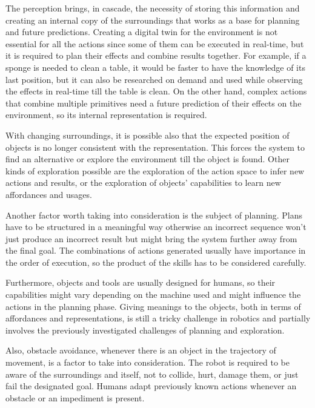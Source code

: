 The perception brings, in cascade, the necessity of storing this information and creating an internal copy of the surroundings that works as a base for planning and future predictions. Creating a digital twin for the environment is not essential for all the actions since some of them can be executed in real-time, but it is required to plan their effects and combine results together. For example, if a sponge is needed to clean a table, it would be faster to have the knowledge of its last position, but it can also be researched on demand and used while observing the effects in real-time till the table is clean. On the other hand, complex actions that combine multiple primitives need a future prediction of their effects on the environment, so its internal representation is required. 

With changing surroundings, it is possible also that the expected position of objects is no longer consistent with the representation. This forces the system to find an alternative or explore the environment till the object is found. Other kinds of exploration possible are the exploration of the action space to infer new actions and results, or the exploration of objects' capabilities to learn new affordances and usages. \cite{Ahmetoglu_2022} 

Another factor worth taking into consideration is the subject of planning. Plans have to be structured in a meaningful way otherwise an incorrect sequence won't just produce an incorrect result but might bring the system further away from the final goal. The combinations of actions generated usually have importance in the order of execution, so the product of the skills has to be considered carefully. 

Furthermore, objects and tools are usually designed for humans, so their capabilities might vary depending on the machine used and might influence the actions in the planning phase. Giving meanings to the objects, both in terms of affordances and representations, is still a tricky challenge in robotics \cite{7523298} and partially involves the previously investigated challenges of planning and exploration. 

Also, obstacle avoidance, whenever there is an object in the trajectory of movement, is a factor to take into consideration. The robot is required to be aware of the surroundings and itself, not to collide, hurt, damage them, or just fail the designated goal. Humans adapt previously known actions whenever an obstacle or an impediment is present. 

